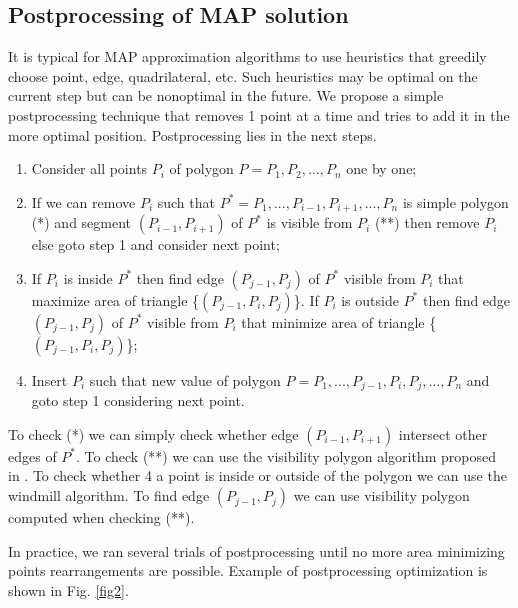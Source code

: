 \documentclass[conference]{IEEEtran}
\begin{document}
		\subsection{Postprocessing of MAP solution}
			It is typical for MAP approximation algorithms to use heuristics that greedily choose point, edge, quadrilateral, etc.
			Such heuristics may be optimal on the current step but can be nonoptimal in the future.
			We propose a simple postprocessing technique that removes 1 point at a time and tries to add it in the more optimal position.
			Postprocessing lies in the next steps.
			\begin{enumerate}
				\item Consider all points $P_{i}$ of polygon $P = P_{1}, P_{2}, ..., P_{n}$ one by one;
				\item If we can remove $P_{i}$ such that $P^{*} = P_{1}, ..., P_{i-1}, P_{i+1}, ..., P_{n}$ is simple polygon (*) 
				and segment $(P_{i-1}, P_{i+1})$ of $P^{*}$ is visible from $P_{i}$ (**) 
				then remove $P_{i}$ else goto step 1 and consider next point;
				\item If $P_{i}$ is inside $P^{*}$ then find edge $(P_{j-1}, P_{j})$ of $P^{*}$ visible from $P_{i}$ that maximize area of triangle \{$(P_{j-1}, P_{i}, P_{j})$\}. 
				If $P_{i}$ is outside  $P^{*}$ then find edge $(P_{j-1}, P_{j})$ of $P^{*}$ visible from $P_{i}$ that minimize area of triangle \{$(P_{j-1}, P_{i}, P_{j})$\};
				\item Insert $P_{i}$ such that new value of polygon $P = P_{1}, ..., P_{j-1}, P_{i}, P_{j}, ..., P_{n}$ and goto step 1 considering next point.
			\end{enumerate}
			
			To check (*) we can simply check whether edge $(P_{i-1}, P_{i+1})$ intersect other edges of $P^{*}$.
			To check (**) we can use the visibility polygon algorithm proposed in \cite{link14}.
			To check whether 4 a point is inside or outside of the polygon we can use the windmill algorithm.
			To find edge $(P_{j-1}, P_{j})$ we can use visibility polygon computed when checking (**).
			
			In practice, we ran several trials of postprocessing until no more area minimizing points rearrangements are possible.
			Example of postprocessing optimization is shown in Fig. \ref{fig2}.
			
\end{document}
